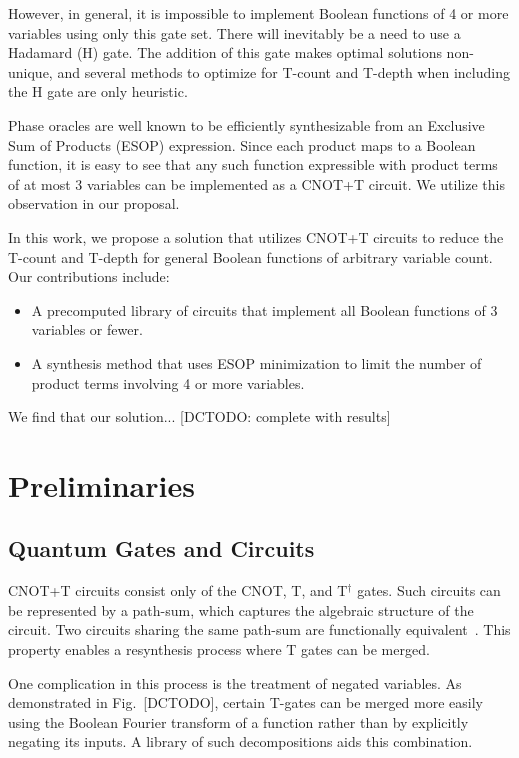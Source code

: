 \documentclass[conference]{IEEEtran}
\begin{document}
However, in general, it is impossible to implement Boolean functions of 4 or more variables using only this gate set. There will inevitably be a need to use a Hadamard (H) gate. The addition of this gate makes optimal solutions non-unique, and several methods to optimize for T-count and T-depth when including the H gate are only heuristic.

Phase oracles are well known to be efficiently synthesizable from an Exclusive Sum of Products (ESOP) expression. Since each product maps to a Boolean function, it is easy to see that any such function expressible with product terms of at most 3 variables can be implemented as a CNOT+T circuit. We utilize this observation in our proposal.

In this work, we propose a solution that utilizes CNOT+T circuits to reduce the T-count and T-depth for general Boolean functions of arbitrary variable count. Our contributions include:

\begin{itemize}
    \item A precomputed library of circuits that implement all Boolean functions of 3 variables or fewer.
    \item A synthesis method that uses ESOP minimization to limit the number of product terms involving 4 or more variables.
\end{itemize}

We find that our solution... [DCTODO: complete with results]

\section{Preliminaries}

\subsection{Quantum Gates and Circuits}
CNOT+T circuits consist only of the CNOT, T, and T$^\dagger$ gates. Such circuits can be represented by a path-sum, which captures the algebraic structure of the circuit. Two circuits sharing the same path-sum are functionally equivalent~\cite{pathsum2018}. This property enables a resynthesis process where T gates can be merged.

One complication in this process is the treatment of negated variables. As demonstrated in Fig.~[DCTODO], certain T-gates can be merged more easily using the Boolean Fourier transform of a function rather than by explicitly negating its inputs. A library of such decompositions aids this combination.
\end{document}
